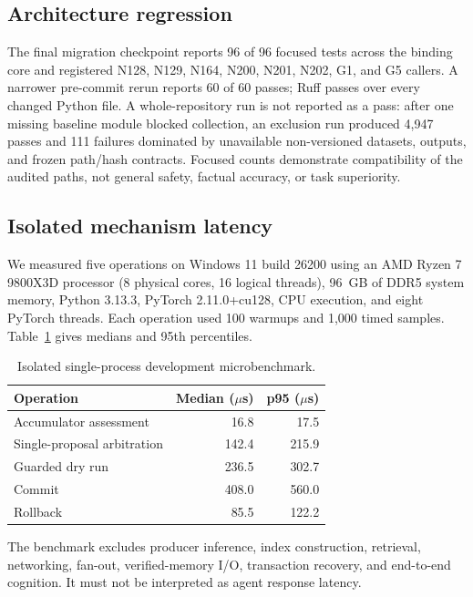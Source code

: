 \documentclass[10pt]{article}
\begin{document}
\subsection{Architecture regression}

The final migration checkpoint reports 96 of 96 focused tests across the binding core and registered N128, N129, N164, N200, N201, N202, G1, and G5 callers. A narrower pre-commit rerun reports 60 of 60 passes; Ruff passes over every changed Python file. A whole-repository run is not reported as a pass: after one missing baseline module blocked collection, an exclusion run produced 4,947 passes and 111 failures dominated by unavailable non-versioned datasets, outputs, and frozen path/hash contracts. Focused counts demonstrate compatibility of the audited paths, not general safety, factual accuracy, or task superiority.

\subsection{Isolated mechanism latency}

We measured five operations on Windows 11 build 26200 using an AMD Ryzen 7 9800X3D processor (8 physical cores, 16 logical threads), 96~GB of DDR5 system memory, Python 3.13.3, PyTorch 2.11.0+cu128, CPU execution, and eight PyTorch threads. Each operation used 100 warmups and 1,000 timed samples. Table~\ref{tab:latency} gives medians and 95th percentiles.

\begin{table}[!htbp]
\centering
\small
\begin{tabular}{@{}lrr@{}}
\toprule
Operation & Median ($\mu$s) & p95 ($\mu$s) \\
\midrule
Accumulator assessment & 16.8 & 17.5 \\
Single-proposal arbitration & 142.4 & 215.9 \\
Guarded dry run & 236.5 & 302.7 \\
Commit & 408.0 & 560.0 \\
Rollback & 85.5 & 122.2 \\
\bottomrule
\end{tabular}
\caption{Isolated single-process development microbenchmark.}
\label{tab:latency}
\end{table}

The benchmark excludes producer inference, index construction, retrieval, networking, fan-out, verified-memory I/O, transaction recovery, and end-to-end cognition. It must not be interpreted as agent response latency.
\end{document}
